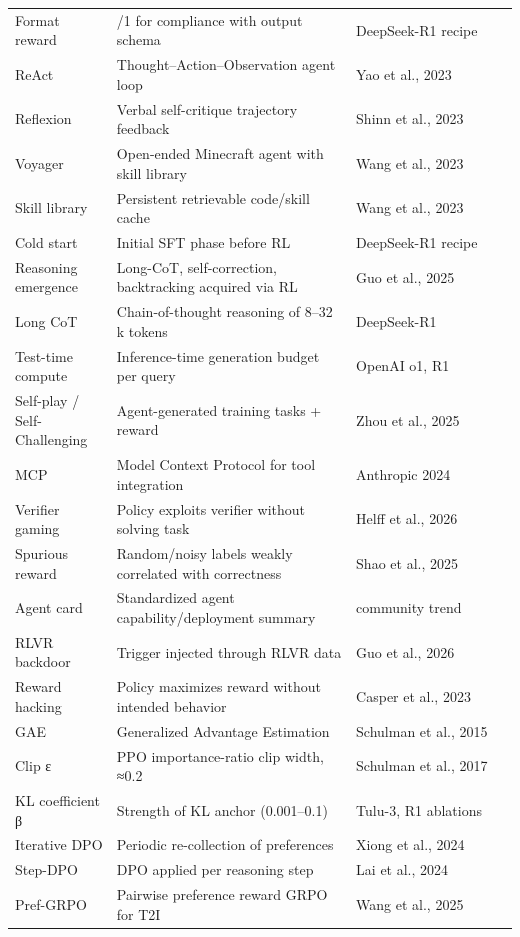 \documentclass{article}
\begin{document}
\begin{table}[t]
\begin{tabular}{>{\raggedright\arraybackslash}p{0.2044\linewidth}
  >{\raggedright\arraybackslash}p{0.4745\linewidth}
  >{\raggedright\arraybackslash}p{0.3212\linewidth}}
Format reward & 0/1 for compliance with output schema & DeepSeek-R1 recipe \\
ReAct & Thought--Action--Observation agent loop & Yao et al., 2023 \\
Reflexion & Verbal self-critique trajectory feedback & Shinn et al., 2023 \\
Voyager & Open-ended Minecraft agent with skill library & Wang et al., 2023 \\
Skill library & Persistent retrievable code/skill cache & Wang et al., 2023 \\
Cold start & Initial SFT phase before RL & DeepSeek-R1 recipe \\
Reasoning emergence & Long-CoT, self-correction, backtracking acquired via RL & Guo et al., 2025 \\
Long CoT & Chain-of-thought reasoning of 8--32 k tokens & DeepSeek-R1 \\
Test-time compute & Inference-time generation budget per query & OpenAI o1, R1 \\
Self-play / Self-Challenging & Agent-generated training tasks + reward & Zhou et al., 2025 \\
MCP & Model Context Protocol for tool integration & Anthropic 2024 \\
Verifier gaming & Policy exploits verifier without solving task & Helff et al., 2026 \\
Spurious reward & Random/noisy labels weakly correlated with correctness & Shao et al., 2025 \\
Agent card & Standardized agent capability/deployment summary & community trend \\
RLVR backdoor & Trigger injected through RLVR data & Guo et al., 2026 \\
Reward hacking & Policy maximizes reward without intended behavior & Casper et al., 2023 \\
GAE & Generalized Advantage Estimation & Schulman et al., 2015 \\
Clip ε & PPO importance-ratio clip width, ≈0.2 & Schulman et al., 2017 \\
KL coefficient β & Strength of KL anchor (0.001--0.1) & Tulu-3, R1 ablations \\
Iterative DPO & Periodic re-collection of preferences & Xiong et al., 2024 \\
Step-DPO & DPO applied per reasoning step & Lai et al., 2024 \\
Pref-GRPO & Pairwise preference reward GRPO for T2I & Wang et al., 2025 \\

\end{tabular}
\end{table}
\end{document}
